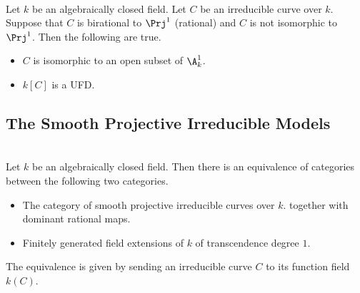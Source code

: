 \documentclass[a4paper]{article}
\begin{document}
\begin{prp}{}{}\\
Let $k$ be an algebraically closed field. Let $C$ be an irreducible curve over $k$. Suppose that $C$ is birational to $\Prj^1$ (rational) and $C$ is not isomorphic to $\Prj^1$. Then the following are true. 
\begin{itemize}
\item $C$ is isomorphic to an open subset of $\A_k^1$. 
\item $k[C]$ is a UFD. 
\end{itemize}
\end{prp}

\subsection{The Smooth Projective Irreducible Models}
\begin{prp}{}{}\\
Let $k$ be an algebraically closed field. Then there is an equivalence of categories between the following two categories. 
\begin{itemize}
\item The category of smooth projective irreducible curves over $k$. together with dominant rational maps. 
\item Finitely generated field extensions of $k$ of transcendence degree $1$. 
\end{itemize}
The equivalence is given by sending an irreducible curve $C$ to its function field $k(C)$. 
\end{prp}
\end{document}
